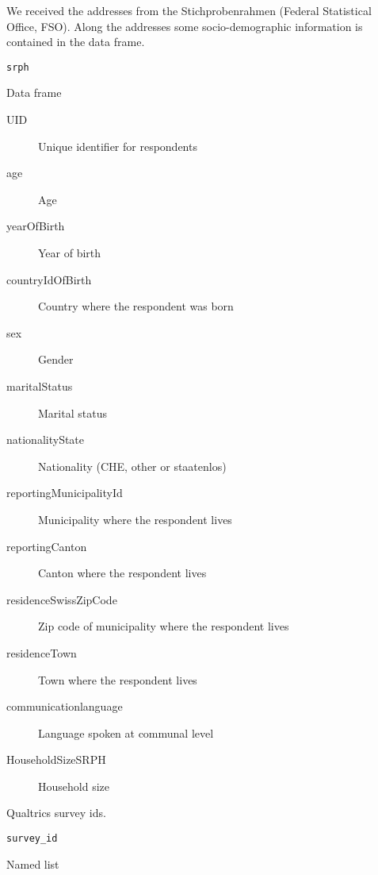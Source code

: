 
%
\begin{Description}
We received the addresses from the Stichprobenrahmen (Federal Statistical Office, FSO).
Along the addresses some socio-demographic information is contained in the data
frame.
\end{Description}
%
\begin{Usage}
\begin{verbatim}
srph
\end{verbatim}
\end{Usage}
%
\begin{Format}
Data frame
\begin{description}

\item[UID] Unique identifier for respondents
\item[age] Age
\item[yearOfBirth] Year of birth
\item[countryIdOfBirth] Country where the respondent was born
\item[sex] Gender
\item[maritalStatus] Marital status
\item[nationalityState] Nationality (CHE, other or staatenlos)
\item[reportingMunicipalityId] Municipality where the respondent lives
\item[reportingCanton] Canton where the respondent lives
\item[residenceSwissZipCode] Zip code of municipality where the respondent lives
\item[residenceTown] Town where the respondent lives
\item[communicationlanguage] Language spoken at communal level
\item[HouseholdSizeSRPH] Household size

\end{description}

\end{Format}
%
\begin{SeeAlso}
\end{SeeAlso}


%
\begin{Description}
Qualtrics survey ids.
\end{Description}
%
\begin{Usage}
\begin{verbatim}
survey_id
\end{verbatim}
\end{Usage}
%
\begin{Format}
Named list
\end{Format}

